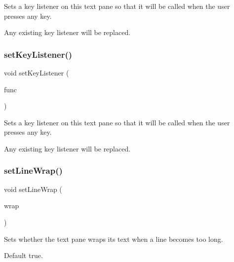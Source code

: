 Sets a key listener on this text pane so that it will be called when the user presses any key. 

Any existing key listener will be replaced. \mbox{\label{classGBrowserPane_ae48ecea73606c7bd9423e1c7cc589cc9}} 
\subsubsection{\texorpdfstring{set\+Key\+Listener()}{setKeyListener()}\hspace{0.1cm}{\footnotesize\ttfamily [2/2]}}
{\footnotesize\ttfamily void set\+Key\+Listener (\begin{DoxyParamCaption}\item[{G\+Event\+Listener\+Void}]{func }\end{DoxyParamCaption})\hspace{0.3cm}{\ttfamily [virtual]}}



Sets a key listener on this text pane so that it will be called when the user presses any key. 

Any existing key listener will be replaced. \mbox{\label{classGBrowserPane_aaaafb06fec060b28b70ec3b7379657b4}} 
\subsubsection{\texorpdfstring{set\+Line\+Wrap()}{setLineWrap()}}
{\footnotesize\ttfamily void set\+Line\+Wrap (\begin{DoxyParamCaption}\item[{bool}]{wrap }\end{DoxyParamCaption})\hspace{0.3cm}{\ttfamily [virtual]}}



Sets whether the text pane wraps its text when a line becomes too long. 

Default true. \mbox{\label{classGBrowserPane_aaa849c4aed1fa43178314f5c76e43081}} 
